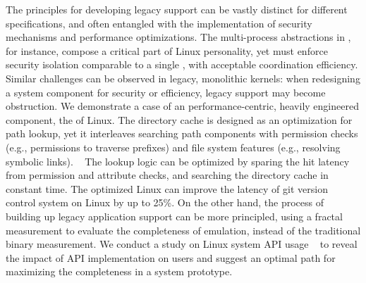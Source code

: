 The principles for developing legacy support can be vastly distinct
for different specifications,
and often entangled with
the implementation of
security mechanisms and performance optimizations.
The multi-process abstractions in \graphene{}, for instance,
compose a critical part of Linux personality,
yet \graphene{} must enforce security isolation comparable to a single \picoproc{},
with acceptable coordination efficiency.
Similar challenges can be observed in legacy, monolithic kernels:
when redesigning a system component for security or efficiency,
legacy support may become obstruction.
We demonstrate a case of an performance-centric, heavily engineered component,
the  of Linux.
The directory cache is designed as an optimization for path lookup,
yet it interleaves searching path components
with permission checks (e.g., permissions to traverse prefixes)
and file system features (e.g., resolving symbolic links).
~\citep{tsai15dcache}
The lookup logic can be optimized
by sparing the hit latency from permission and attribute checks,
and searching the directory cache in constant time.
The optimized Linux
can improve the latency of git version control system on Linux by up to 25\%.
On the other hand,
the process of building up legacy application support
can be more principled,
using a fractal measurement to evaluate the completeness of emulation,
instead of the traditional binary measurement.
%
We conduct a study on Linux system API usage
~\citep{tsai16apistudy}
to reveal the impact of API implementation on users
and suggest an optimal path for maximizing the completeness in a system prototype.


